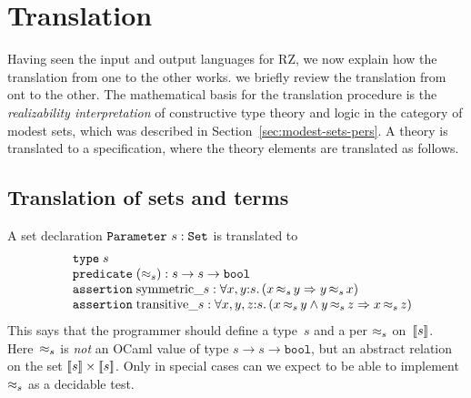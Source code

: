 \section{Translation}
\label{sec:translation}

Having seen the input and output languages for RZ,
%
\iflong
we now explain how the translation from one to the other works.
\else
we briefly review the translation from ont to the other.
\fi
%
The mathematical basis for the translation procedure is the
\emph{realizability interpretation} of constructive type theory and
logic in the category of modest sets, which was described in
Section~\ref{sec:modest-sets-pers}. A theory is translated to a
specification, where the theory elements are translated as follows.



\subsection{Translation of sets and terms}
\label{sec:transl-sets-terms}

A set declaration $\iParameter{s}{\iSet}$ is translated to
%
\[
\begin{array}{ll}
  & \otyspec{s} \\
  & \opropspec{({\approx_{s}})}{\oarrow{s}{\oarrow{s}{\oProp}}}\\
  & \oassertion{\mathrm{symmetric}\_{s}}{
    \oforall{x,y}{s}{(\oimply{\oper{s}{x}{y}}{\oper{s}{y}{x}})}
  }
  \\
  & \oassertion{\mathrm{transitive}\_{s}}{
    \oforall{x,y,z}{s}{(
      \oimply{
        \oper{s}{x}{y} \land \oper{s}{y}{z}
      }{\oper{s}{x}{z}}
      )}
  }
\end{array}
\]
%
This says that the programmer should define a type~$s$ and a per
$\per_s$ on~$\values{s}$. Here~$\per_s$ is \emph{not} an OCaml value
of type $s \to s \to \mathtt{bool}$, but an abstract relation on the
set $\values{s} \times \values{s}$. Only in special cases can we
expect to be able to implement~$\per_s$ as a decidable test.  


